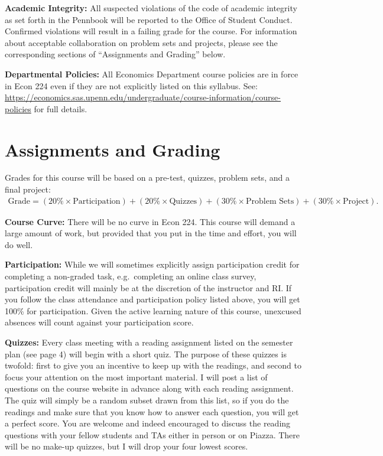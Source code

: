 \documentclass[11pt, letterpaper]{article}
\begin{document}
\medskip

\noindent \textbf{Academic Integrity:} 
All suspected violations of the code of academic integrity as set forth in the Pennbook will be reported to the Office of Student Conduct. 
Confirmed violations will result in a failing grade for the course. 
For information about acceptable collaboration on problem sets and projects, please see the corresponding sections of ``Assignments and Grading'' below.

\medskip

\noindent \textbf{Departmental Policies: } 
All Economics Department course policies are in force in Econ 224 even if they are not explicitly listed on this syllabus. 
See: \url{https://economics.sas.upenn.edu/undergraduate/course-information/course-policies} for full details.

\medskip

\section*{Assignments and Grading}
Grades for this course will be based on a pre-test, quizzes, problem sets, and a final project:
	\begin{equation*}
	\begin{split}
    \mbox{Grade} = (20\% \times \mbox{Participation})  + (20\% \times \mbox{Quizzes}) + (30\% \times \mbox{Problem Sets}) +  (30\% \times \mbox{Project}).
	\end{split}
	\end{equation*}

\medskip

\noindent \textbf{Course Curve:}
There will be no curve in Econ 224. 
This course will demand a large amount of work, but provided that you put in the time and effort, you will do well. 

\medskip 

\noindent \textbf{Participation:} 
While we will sometimes explicitly assign participation credit for completing a non-graded task, e.g.\ completing an online class survey, participation credit will mainly be at the discretion of the instructor and RI.
If you follow the class attendance and participation policy listed above, you will get 100\% for participation.  
Given the active learning nature of this course, unexcused absences will count against your participation score.

\medskip


\noindent \textbf{Quizzes:} 
Every class meeting with a reading assignment listed on the semester plan (see page 4) will begin with a short quiz.
The purpose of these quizzes is twofold: first to give you an incentive to keep up with the readings, and second to focus your attention on the most important material.
I will post a list of questions on the course website in advance along with each reading assignment.
The quiz will simply be a random subset drawn from this list, so if you do the readings and make sure that you know how to answer each question, you will get a perfect score.
You are welcome and indeed encouraged to discuss the reading questions with your fellow students and TAs either in person or on Piazza.
There will be no make-up quizzes, but I will drop your four lowest scores.
\end{document}
